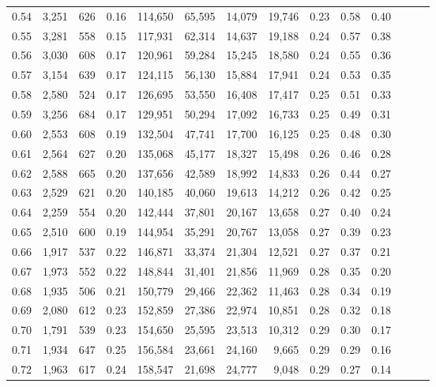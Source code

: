 \begin{tabular}{rrrrrrrrrrrrrr}
0.54 &  3,251 &  626 &  0.16 &  114,650 &   65,595 &  14,079 &  19,746 &  0.23 &  0.58 &      0.40 \\
0.55 &  3,281 &  558 &  0.15 &  117,931 &   62,314 &  14,637 &  19,188 &  0.24 &  0.57 &      0.38 \\
0.56 &  3,030 &  608 &  0.17 &  120,961 &   59,284 &  15,245 &  18,580 &  0.24 &  0.55 &      0.36 \\
0.57 &  3,154 &  639 &  0.17 &  124,115 &   56,130 &  15,884 &  17,941 &  0.24 &  0.53 &      0.35 \\
0.58 &  2,580 &  524 &  0.17 &  126,695 &   53,550 &  16,408 &  17,417 &  0.25 &  0.51 &      0.33 \\
0.59 &  3,256 &  684 &  0.17 &  129,951 &   50,294 &  17,092 &  16,733 &  0.25 &  0.49 &      0.31 \\
0.60 &  2,553 &  608 &  0.19 &  132,504 &   47,741 &  17,700 &  16,125 &  0.25 &  0.48 &      0.30 \\
0.61 &  2,564 &  627 &  0.20 &  135,068 &   45,177 &  18,327 &  15,498 &  0.26 &  0.46 &      0.28 \\
0.62 &  2,588 &  665 &  0.20 &  137,656 &   42,589 &  18,992 &  14,833 &  0.26 &  0.44 &      0.27 \\
0.63 &  2,529 &  621 &  0.20 &  140,185 &   40,060 &  19,613 &  14,212 &  0.26 &  0.42 &      0.25 \\
0.64 &  2,259 &  554 &  0.20 &  142,444 &   37,801 &  20,167 &  13,658 &  0.27 &  0.40 &      0.24 \\
0.65 &  2,510 &  600 &  0.19 &  144,954 &   35,291 &  20,767 &  13,058 &  0.27 &  0.39 &      0.23 \\
0.66 &  1,917 &  537 &  0.22 &  146,871 &   33,374 &  21,304 &  12,521 &  0.27 &  0.37 &      0.21 \\
0.67 &  1,973 &  552 &  0.22 &  148,844 &   31,401 &  21,856 &  11,969 &  0.28 &  0.35 &      0.20 \\
0.68 &  1,935 &  506 &  0.21 &  150,779 &   29,466 &  22,362 &  11,463 &  0.28 &  0.34 &      0.19 \\
0.69 &  2,080 &  612 &  0.23 &  152,859 &   27,386 &  22,974 &  10,851 &  0.28 &  0.32 &      0.18 \\
0.70 &  1,791 &  539 &  0.23 &  154,650 &   25,595 &  23,513 &  10,312 &  0.29 &  0.30 &      0.17 \\
0.71 &  1,934 &  647 &  0.25 &  156,584 &   23,661 &  24,160 &   9,665 &  0.29 &  0.29 &      0.16 \\
0.72 &  1,963 &  617 &  0.24 &  158,547 &   21,698 &  24,777 &   9,048 &  0.29 &  0.27 &      0.14 \\

\end{tabular}
